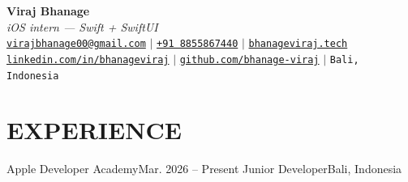 


\begin{center}
    \textbf{\Huge Viraj Bhanage} \\ \vspace{4pt}
    {\small\textit{iOS intern --- Swift + SwiftUI}} \\ \vspace{4pt}
    \small
    \faEnvelope \hspace{2pt} \href{mailto:virajbhanage00@gmail.com}{\texttt{virajbhanage00@gmail.com}} \hspace{1pt} $|$
    \hspace{1pt} \faPhone \hspace{2pt} \href{tel:+918855867440}{\texttt{+91 8855867440}} \hspace{1pt} $|$
    \hspace{1pt} \href{https://www.bhanageviraj.tech}{\texttt{bhanageviraj.tech}} \\
    \faLinkedin \hspace{2pt} \href{https://www.linkedin.com/in/bhanageviraj/}{\texttt{linkedin.com/in/bhanageviraj}} \hspace{1pt} $|$
    \hspace{1pt} \faGithub \hspace{2pt} \href{https://github.com/bhanage-viraj}{\texttt{github.com/bhanage-viraj}} \hspace{1pt} $|$
    \hspace{1pt} \faMapMarker* \hspace{2pt}\texttt{Bali, Indonesia}
\end{center}

\section{EXPERIENCE}
  \resumeSubHeadingListStart
    \resumeSubheading
      {Apple Developer Academy}{Mar. 2026 -- Present}
      {Junior Developer}{Bali, Indonesia}
      \resumeItemListStart
      \resumeItemListEnd
  \resumeSubHeadingListEnd

